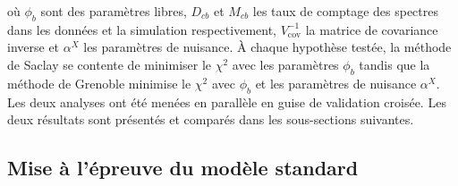\bigbreak

où $\phi_b$ sont des paramètres libres, $D_{cb}$ et $M_{cb}$ les taux de comptage des spectres dans les données et la simulation respectivement, $V^{-1}_\textrm{cov}$ la matrice de covariance inverse et $\alpha^X$ les paramètres de nuisance. À chaque hypothèse testée, la méthode de Saclay se contente de minimiser le $\chi^2$ avec les paramètres $\phi_b$ tandis que la méthode de Grenoble minimise le $\chi^2$ avec $\phi_b$ et les paramètres de nuisance $\alpha^X$. Les deux analyses ont été menées en parallèle en guise de validation croisée. Les deux résultats sont présentés et comparés dans les sous-sections suivantes.

\bigbreak

\subsection{Mise à l'épreuve du modèle standard}

